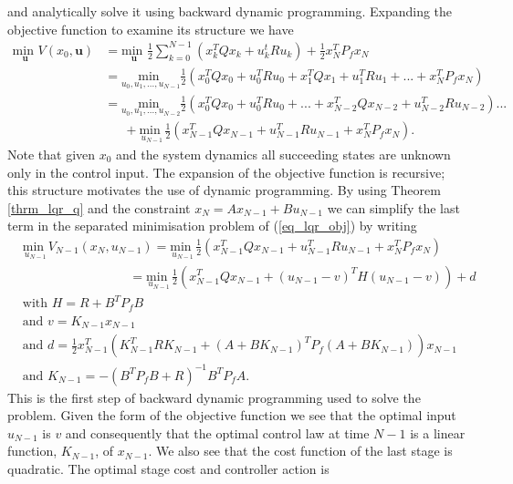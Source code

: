 and analytically solve it using backward dynamic programming. Expanding the objective function to examine its structure we have
\begin{equation}
\begin{aligned}
\underset{\mathbf{u}}{\text{min }} V(x_0, \mathbf{u}) &= \underset{\mathbf{u}}{\text{min }} \frac{1}{2}\sum_{k=0}^{N-1} \left( x_k^TQx_k + u_k^tRu_k \right) + \frac{1}{2}x_N^TP_fx_N \\
&= \underset{u_0, u_1,...,u_{N-1}}{\text{min }}  \frac{1}{2}\left( x_0^TQx_0 + u_0^TRu_0 +x_1^TQx_1 + u_1^TRu_1 + ... + x_N^TP_fx_N \right) \\
&= \underset{u_0, u_1,...,u_{N-2}}{\text{min }}  \frac{1}{2}\left( x_0^TQx_0 + u_0^TRu_0 + ... + x_{N-2}^TQx_{N-2} + u_{N-2}^TRu_{N-2} \right)... \\
& \hspace{18pt} + \underset{u_{N-1}}{\text{min }} \frac{1}{2} \left(x_{N-1}^TQx_{N-1}+ u_{N-1}^TRu_{N-1} + x_N^TP_fx_N\right).
\end{aligned}
\label{eq_lqr_expand_obj}
\end{equation}
Note that given $x_0$ and the system dynamics all succeeding states are unknown only in the control input. The expansion of the objective function is recursive; this structure motivates the use of dynamic programming. By using Theorem \ref{thrm_lqr_q} and the constraint $x_N=Ax_{N-1}+Bu_{N-1}$ we can simplify the last term in the separated minimisation problem of (\ref{eq_lqr_obj}) by writing
\begin{equation}
\begin{aligned}
&\underset{u_{N-1}}{\text{min }}V_{N-1}(x_N, u_{N-1}) =\underset{u_{N-1}}{\text{min }} \frac{1}{2} \left(x_{N-1}^TQx_{N-1}+ u_{N-1}^TRu_{N-1} + x_N^TP_fx_N\right) \\ 
&\hspace{100pt} = \underset{u_{N-1}}{\text{min }}\frac{1}{2} \left(x_{N-1}^TQx_{N-1} + (u_{N-1}-v)^TH(u_{N-1}-v)\right) + d \\
&\text{with } H = R+B^TP_fB \\
&\text{and } v = K_{N-1}x_{N-1} \\
&\text{and } d = \frac{1}{2}x_{N-1}^T\left(K_{N-1}^TRK_{N-1}+(A+BK_{N-1})^TP_f(A+BK_{N-1})  \right)x_{N-1}\\
&\text{and } K_{N-1} = -(B^TP_fB+R)^{-1}B^TP_fA.
\end{aligned}
\label{eq_lqr_sum_q}
\end{equation}
This is the first step of backward dynamic programming used to solve the problem. Given the form of the objective function we see that the optimal input $u_{N-1}$ is $v$ and consequently that the optimal control law at time $N-1$ is a linear function, $K_{N-1}$, of $x_{N-1}$. We also see that the cost function of the last stage is quadratic. The optimal stage cost and controller action is

